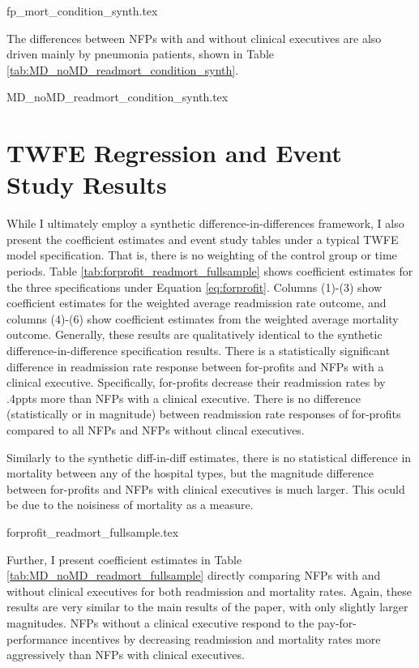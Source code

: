\documentclass[12pt]{article}
\begin{document}
{fp_mort_condition_synth.tex}

The differences between NFPs with and without clinical executives are also driven mainly by pneumonia patients, shown in Table \ref{tab:MD_noMD_readmort_condition_synth}.

{MD_noMD_readmort_condition_synth.tex}

\section{TWFE Regression and Event Study Results}\label{app:fullsample}

While I ultimately employ a synthetic difference-in-differences framework, I also present the coefficient estimates and event study tables under a typical TWFE model specification. That is, there is no weighting of the control group or time periods. Table \ref{tab:forprofit_readmort_fullsample} shows coefficient estimates for the three specifications under Equation \ref{eq:forprofit}. Columns (1)-(3) show coefficient estimates for the weighted average readmission rate outcome, and columns (4)-(6) show coefficient estimates from the weighted average mortality outcome. Generally, these results are qualitatively identical to the synthetic difference-in-difference specification results. There is a statistically significant difference in readmission rate response between for-profits and NFPs with a clinical executive. Specifically, for-profits decrease their readmission rates by .4ppts more than NFPs with a clinical executive. There is no difference (statistically or in magnitude) between readmission rate responses of for-profits compared to all NFPs and NFPs without clincal executives. 

Similarly to the synthetic diff-in-diff estimates, there is no statistical difference in mortality between any of the hospital types, but the magnitude difference between for-profits and NFPs with clinical executives is much larger. This oculd be due to the noisiness of mortality as a measure. 

{forprofit_readmort_fullsample.tex}

Further, I present coefficient estimates in Table \ref{tab:MD_noMD_readmort_fullsample} directly comparing NFPs with and without clinical executives for both readmission and mortality rates. Again, these results are very similar to the main results of the paper, with only slightly larger magnitudes. NFPs without a clinical executive respond to the pay-for-performance incentives by decreasing readmission and mortality rates more aggressively than NFPs with clinical executives. 
\end{document}
